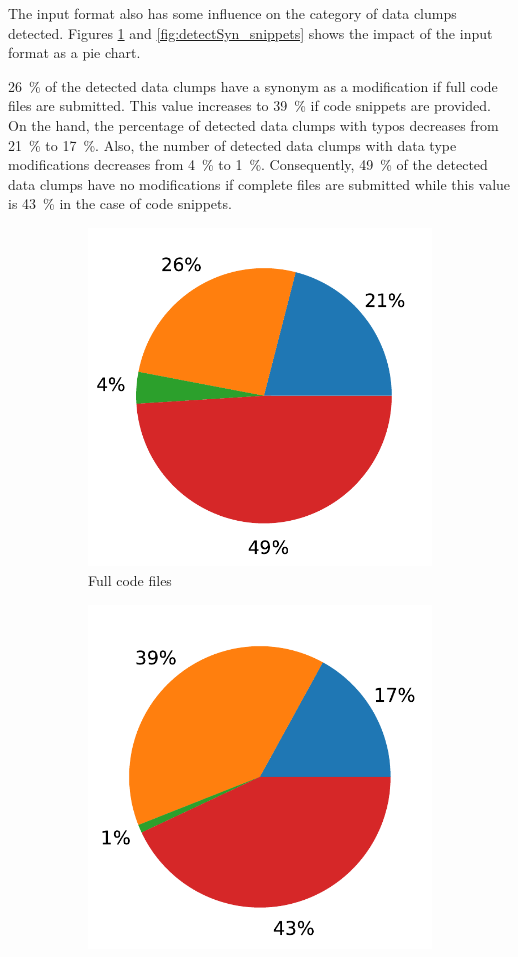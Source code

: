 The input format also has some influence on the category of data clumps detected. Figures \ref{fig:detectSyn_full_files} and \ref{fig:detectSyn_snippets} shows the impact of the input format as a pie chart. 

 26~\% of the detected data clumps have a synonym as a modification if full code files are submitted. This value increases to 39~\% if code snippets are provided. On the hand, the percentage of detected data clumps with typos decreases from 21~\% to 17~\%. Also, the number of detected data clumps with data type modifications decreases from 4~\% to 1~\%. Consequently, 49~\% of the detected data clumps have no modifications if complete files are submitted while this value is 43~\% in the case of code snippets.  

\begin{figure}[ht!]
    \centering
    \begin{subfigure}[t]{0.44\columnwidth}
        \includegraphics[width=0.8\columnwidth]{figures/chapter5/detectSyn_input_fullFile.pdf}
        \caption{Full code files}
        \label{fig:detectSyn_full_files}
    \end{subfigure}
            \begin{subfigure}[t]{0.44\columnwidth}
        \includegraphics[width=0.8\columnwidth]{figures/chapter5/detectSyn_input_snippet.pdf}

\end{subfigure}
\end{figure}
